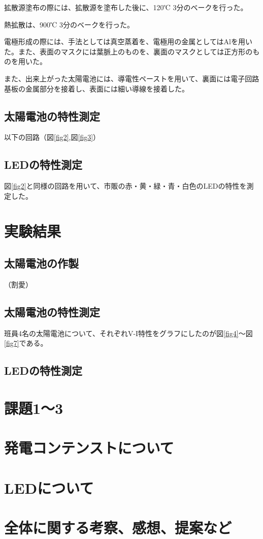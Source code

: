 \documentclass[11pt]{ltjsarticle}
\newcommand{\fr}[1]{図\ref{#1}}
\begin{document}
		拡散源塗布の際には、拡散源を塗布した後に、120℃ 3分のベークを行った。
		
		熱拡散は、900℃ 3分のベークを行った。
		
		電極形成の際には、手法としては真空蒸着を、電極用の金属としてはAlを用いた。また、表面のマスクには葉脈上のものを、裏面のマスクとしては正方形のものを用いた。

		また、出来上がった太陽電池には、導電性ペーストを用いて、裏面には電子回路基板の金属部分を接着し、表面には細い導線を接着した。

	\subsection{太陽電池の特性測定}
		以下の回路（\fr{fig2},\fr{fig3}） %
	\subsection{LEDの特性測定}
		\fr{fig2}と同様の回路を用いて、市販の赤・黄・緑・青・白色のLEDの特性を測定した。
\section{実験結果}
	\subsection{太陽電池の作製}
		（割愛）
	\subsection{太陽電池の特性測定}
		班員4名の太陽電池について、それぞれV-I特性をグラフにしたのが\fr{fig4}〜\fr{fig7}である。 %
	\subsection{LEDの特性測定}
\section{課題1〜3}
\section{発電コンテンストについて}
\section{LEDについて}
\section{全体に関する考察、感想、提案など}
\end{document}
